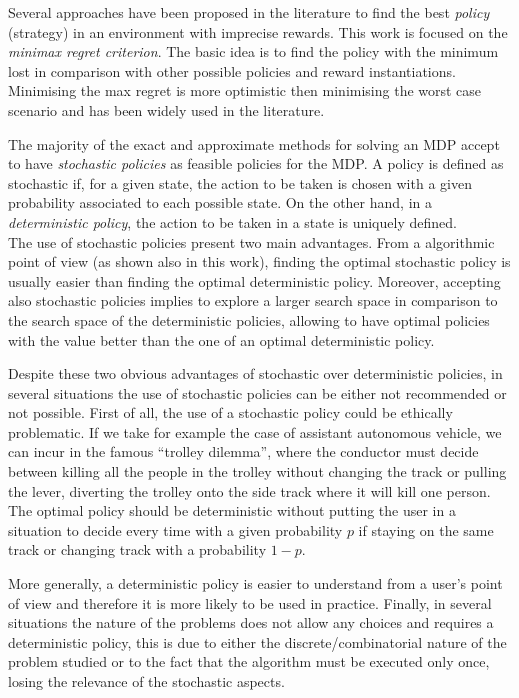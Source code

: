 \documentclass[runningheads,a4paper]{llncs}
\begin{document}
Several approaches have been proposed in the literature to find the best \textit{policy} (strategy) in an environment with imprecise rewards. This work is focused on the \textit{minimax regret criterion}. The basic idea is to find the policy with the minimum lost in comparison with other possible policies and reward instantiations. Minimising the max regret is more optimistic then  minimising the worst case scenario and has been widely used in the literature. %

The majority of the exact and approximate methods for solving an MDP accept to have \textit{stochastic policies} as feasible policies for the MDP. A policy is defined as stochastic if, for a given state, the action to be taken is chosen with a given probability associated to each possible state.
On the other hand, in a \textit{deterministic policy}, the action to be taken in a state is uniquely defined.\\
The use of stochastic policies present two main advantages. From a algorithmic point of view (as shown also in this work), finding the optimal stochastic policy is usually easier than finding the optimal deterministic policy. Moreover, accepting also stochastic policies implies to explore a larger search space in comparison to the search space of the deterministic policies, allowing to have optimal policies with the value better than the one of an optimal deterministic policy.

Despite these two obvious advantages of stochastic over deterministic policies, in several situations the use of stochastic policies can be either not recommended or not possible. First of all, the use of a stochastic policy could be ethically problematic. If we take for example the case of assistant autonomous vehicle, we can incur in the famous ``trolley dilemma'', where the conductor must decide between killing all the people in the trolley without changing the track or pulling the lever, diverting the trolley onto the side track where it will kill one person. The optimal policy should be deterministic without putting the user in a situation to decide every time with a given probability $p$ if staying on the same track or changing track with a probability $1-p$. 

More generally, a deterministic policy is easier to understand from a user's point of view and therefore it is more likely to be used in practice. Finally, in several situations the nature of the problems does not allow any choices and requires a deterministic policy, this is due to either the discrete/combinatorial nature of the problem studied or to the fact that the algorithm must be executed only once, losing the relevance of the stochastic aspects. 
\end{document}
